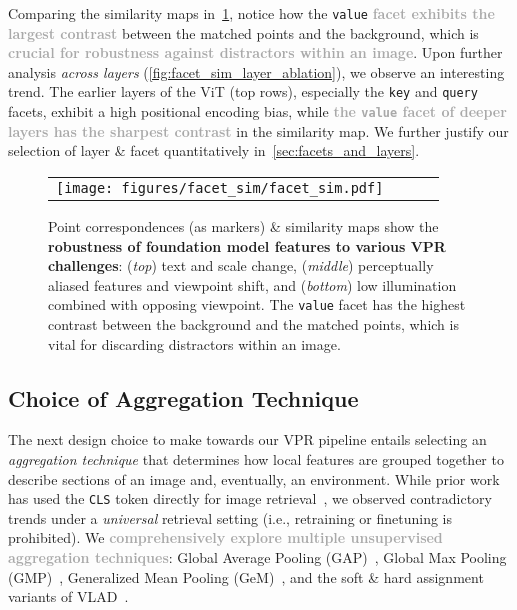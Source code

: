 \documentclass[letterpaper, 10 pt, conference]{ieeeconf}  \fi
\newcommand{\highlight}[1]{\textcolor{darkgray}{\textbf{#1}}}
\begin{document}
Comparing the similarity maps in~\cref{fig:facet_sim}, notice how the \texttt{value} \highlight{facet exhibits the largest contrast}
between the matched points and the background, which is \highlight{crucial for robustness against distractors within an image}. 
Upon further analysis \textit{across layers} (\cref{fig:facet_sim_layer_ablation}), we observe an interesting trend. The earlier layers of the ViT (top rows), especially the \texttt{key} and \texttt{query} facets, exhibit a high positional encoding bias, while \highlight{the \textnormal{\texttt{value}} facet of deeper layers has the sharpest contrast} in the similarity map.
We further justify our selection of layer \& facet quantitatively in~\cref{sec:facets_and_layers}.

\begin{figure}[!t]
\centering
\begin{tabular}{cccc}
\texttt{[image: figures/facet\_sim/facet\_sim.pdf]} 
\end{tabular}
\caption{Point correspondences (as markers) \& similarity maps show the \textbf{robustness of foundation model features to various VPR challenges}: (\textit{top}) text and scale change, (\textit{middle}) perceptually aliased features and viewpoint shift, and (\textit{bottom}) low illumination combined with opposing viewpoint. The \texttt{value} facet has the highest contrast between the background and the matched points, which is vital for discarding distractors within an image.}
\label{fig:facet_sim}
\end{figure}

\subsection{Choice of Aggregation Technique}
\label{sec:aggregating_features}
The next design choice to make towards our VPR pipeline entails selecting an \emph{aggregation technique} that determines how local features are grouped together to describe sections of an image and, eventually, an environment.
While prior work has used the \texttt{CLS} token directly for image retrieval~\cite{el2021training, oquab2023dinov2, kassab2023clip},
we observed contradictory trends under a \emph{universal} retrieval setting (i.e., retraining or finetuning is prohibited).
We \highlight{comprehensively explore multiple unsupervised aggregation techniques}: Global Average Pooling (GAP)~\cite{babenko2015aggregating}, Global Max Pooling (GMP)~\cite{razavian2016visual}, Generalized Mean Pooling (GeM)~\cite{radenovic2018fine}, and the soft \& hard assignment variants of VLAD~\cite{jegou2010aggregating}.
\end{document}
